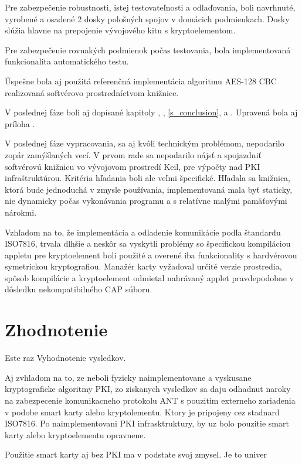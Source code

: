 \documentclass[12pt,a4wide,oneside,openright]{report}
\begin{document}
Pre zabezpečenie robustnosti, istej testovateľnosti a odlaďovania, boli navrhnuté, vyrobené a osadené 2 dosky pološných spojov v domácich podmienkach. Dosky slúžia hlavne na prepojenie vývojového kitu s kryptoelementom.

Pre zabezpečenie rovnakých podmienok počas testovania, bola implementovaná funkcionalita automatického testu.

Úspešne bola aj použitá referenčná implementácia algoritmu AES-128 CBC realizovaná softvérovo prostredníctvom knižnice.

V poslednej fáze boli aj dopísané kapitoly , , \ref{s_conclusion},  a . Upravená bola aj príloha .

V poslednej fáze vypracovania, sa aj kvôli technickým problémom, nepodarilo zopár zamýšlaných vecí.
V prvom rade sa nepodarilo nájsť a spojazdniť softvérovú knižnicu vo vývojovom prostredí Keil, pre výpočty nad PKI infraštruktúrou. Kritéria hľadania boli ale veľmi špecifické. Hľadala sa knižnica, ktorá bude jednoduchá v zmysle používania, implementovaná mala byť  staticky, nie dynamicky počas vykonávania programu a s relatívne malými pamäťovými nárokmi.

Vzhľadom na to, že implementácia a odladenie komunikácie podľa štandardu ISO7816, trvala dlhšie a neskôr sa vyskytli problémy so špecifickou kompiláciou appletu pre kryptoelement  boli použité a overené iba funkcionality s hardvérovou symetrickou kryptografiou. Manažér karty vyžadoval určité verzie prostredia, spôsob kompilácie a kryptoelement odmietal nahrávaný applet pravdepodobne v dôsledku nekompatibilného CAP súboru.


\section{Zhodnotenie}


Este raz Vyhodnotenie vysledkov.

Aj zvhladom na to, ze neboli fyzicky naimplementovane a vyskusane kryptograficke algoritmy PKI, zo ziskanych vysledkov sa daju odhadnut naroky na zabezpecenie komunikacneho protokolu ANT s pouzitim externeho zariadenia v podobe smart karty alebo kryptolementu. Ktory je pripojeny cez stadnard ISO7816. Po naimplementovani PKI infrasktruktury, by uz bolo pouzitie smart karty alebo kryptoelementu opravnene. 

Použitie smart karty aj bez PKI ma v podstate svoj zmysel. Je to univer
\end{document}
